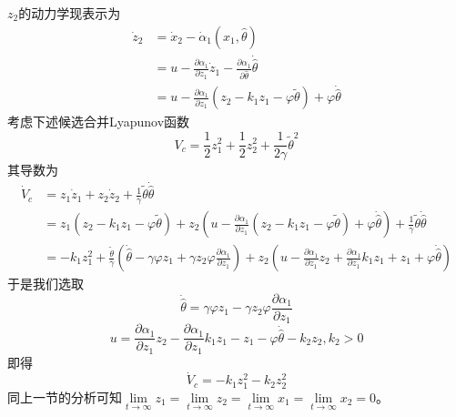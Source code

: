 
$z_2$的动力学现表示为
\begin{align*}
  \dot{z}_2 & = \dot{x}_2 - \dot{\alpha}_1 (x_1, \hat{\theta})\\
  & = u - \frac{\partial \alpha_1}{\partial z_1} \dot{z}_1 - \frac{\partial
  \alpha_1}{\partial \hat{\theta} } \dot{\hat{\theta}} \\
  & = u - \frac{\partial \alpha_1}{\partial z_1} (z_2 - k_1 z_1 - \varphi
  \tilde{\theta}) + \varphi \dot{\hat{\theta} }
\end{align*}
考虑下述候选合并Lyapunov函数
\[ V_c = \frac{1}{2} z^2_1 + \frac{1}{2} z^2_2 + \frac{1}{2 \gamma }
   \tilde{\theta}^2 \]
其导数为
\begin{align*}
  \dot{V}_c & = z_1 \dot{z}_1 + z_2 \dot{z}_2 + \frac{1}{\gamma}
  \tilde{\theta} \dot{\hat{\theta}}\\
  & = z_1 (z_2 - k_1 z_1 - \varphi \tilde{\theta}) + z_2 \left( u -
  \frac{\partial \alpha_1}{\partial z_1} (z_2 - k_1 z_1 - \varphi
  \tilde{\theta}) + \varphi \dot{\hat{\theta} } \right) + \frac{1}{\gamma}
  \tilde{\theta} \dot{\hat{\theta}}\\
  & = - k_1 z^2_1 + \frac{\tilde{\theta}}{\gamma} \left( \dot{\hat{\theta}}
  - \gamma \varphi z_1 + \gamma z_2 \varphi \frac{\partial \alpha_1}{\partial
  z_1} \right) + z_2 \left( u - \frac{\partial \alpha_1}{\partial z_1} z_2 +
  \frac{\partial \alpha_1}{\partial z_1} k_1 z_1 + z_1 + \varphi
  \dot{\hat{\theta} } \right)
\end{align*}
于是我们选取
\[ \dot{\hat{\theta}} = \gamma \varphi z_1 - \gamma z_2 \varphi \frac{\partial
   \alpha_1}{\partial z_1} \]
\[ u = \frac{\partial \alpha_1}{\partial z_1} z_2 - \frac{\partial
   \alpha_1}{\partial z_1} k_1 z_1 - z_1 - \varphi \dot{\hat{\theta} } - k_2
   z_2, k_2 > 0 \]
即得
\[ \dot{V}_c = - k_1 z^2_1 - k_2 z^2_2 \]
同上一节的分析可知$\lim\limits_{t \rightarrow \infty} z_1 = \lim\limits_{t \rightarrow
\infty} z_2 =\lim\limits_{t \rightarrow \infty} x_1 = \lim\limits_{t \rightarrow \infty} x_2 = 0$。
